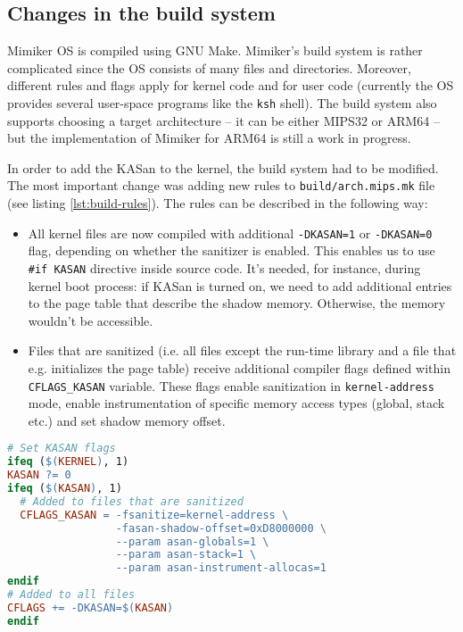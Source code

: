 \documentclass[shortabstract, manyadvisors, english, mgr]{iithesis}
\theoremstyle{definition} \newtheorem*{definition}{Definicja}
\theoremstyle{definition} \newtheorem*{example}{Przykład}
\theoremstyle{definition} \newtheorem*{remark}{Uwaga}
\begin{document}
\subsection{Changes in the build system}
\label{lbl:kasan-build-system}
Mimiker OS is compiled using GNU Make. Mimiker's build system is rather complicated since the OS consists of many files and directories. Moreover, different rules and flags apply for kernel code and for user code (currently the OS provides several user-space programs like the \texttt{ksh} shell). The build system also supports choosing a target architecture -- it can be either MIPS32 or ARM64 -- but the implementation of Mimiker for ARM64 is still a work in progress.

In order to add the KASan to the kernel, the build system had to be modified. The most important change was adding new rules to \texttt{build/arch.mips.mk} file (see listing \ref{lst:build-rules}). The rules can be described in the following way:
\begin{itemize}
\item All kernel files are now compiled with additional \texttt{-DKASAN=1} or \texttt{-DKASAN=0} flag, depending on whether the sanitizer is enabled. This enables us to use \texttt{\#if~KASAN} directive inside source code. It's needed, for instance, during kernel boot process: if KASan is turned on, we need to add additional entries to the page table that describe the shadow memory. Otherwise, the memory wouldn't be accessible.
\item Files that are sanitized (i.e. all files except the run-time library and a file that e.g. initializes the page table) receive additional compiler flags defined within \texttt{CFLAGS\_KASAN} variable. These flags enable sanitization in \texttt{kernel-address} mode, enable instrumentation of specific memory access types (global, stack etc.) and set shadow memory offset.
\end{itemize}

\begin{lstlisting}[language=make, label={lst:build-rules}, caption={New build rules added to \texttt{build/arch.mips.mk} file.}]
# Set KASAN flags
ifeq ($(KERNEL), 1)
KASAN ?= 0
ifeq ($(KASAN), 1)
  # Added to files that are sanitized
  CFLAGS_KASAN = -fsanitize=kernel-address \
                 -fasan-shadow-offset=0xD8000000 \
                 --param asan-globals=1 \
                 --param asan-stack=1 \
                 --param asan-instrument-allocas=1
endif
# Added to all files
CFLAGS += -DKASAN=$(KASAN)
endif
\end{lstlisting}
\end{document}
